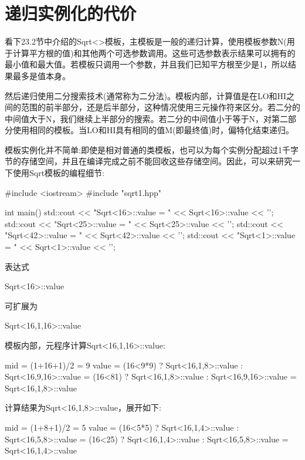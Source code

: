 \section{递归实例化的代价}

看下23.2节中介绍的Sqrt<>模板，主模板是一般的递归计算，使用模板参数N(用于计算平方根的值)和其他两个可选参数调用。这些可选参数表示结果可以拥有的最小值和最大值。若模板只调用一个参数，并且我们已知平方根至少是1，所以结果最多是值本身。

然后递归使用二分搜索技术(通常称为二分法)。模板内部，计算值是在LO和HI之间的范围的前半部分，还是后半部分，这种情况使用三元操作符来区分。若二分的中间值大于N，我们继续上半部分的搜索。若二分的中间值小于等于N，对第二部分使用相同的模板。当LO和HI具有相同的值M(即最终值)时，偏特化结束递归。

模板实例化并不简单:即使是相对普通的类模板，也可以为每个实例分配超过1千字节的存储空间，并且在编译完成之前不能回收这些存储空间。因此，可以来研究一下使用Sqrt模板的编程细节:

\begin{cpp}
#include <iostream>
#include "sqrt1.hpp"

int main()
{
	std::cout << "Sqrt<16>::value = " << Sqrt<16>::value << ’\n’;
	std::cout << "Sqrt<25>::value = " << Sqrt<25>::value << ’\n’;
	std::cout << "Sqrt<42>::value = " << Sqrt<42>::value << ’\n’;
	std::cout << "Sqrt<1>::value = " << Sqrt<1>::value << ’\n’;
}
\end{cpp}

表达式

\begin{cpp}
Sqrt<16>::value
\end{cpp}

可扩展为

\begin{cpp}
Sqrt<16,1,16>::value
\end{cpp}

模板内部，元程序计算Sqrt<16,1,16>::value:

\begin{cpp}
mid = (1+16+1)/2
	= 9
value = (16<9*9) ? Sqrt<16,1,8>::value
				: Sqrt<16,9,16>::value
	  = (16<81) ? Sqrt<16,1,8>::value
				: Sqrt<16,9,16>::value
	  = Sqrt<16,1,8>::value
\end{cpp}

计算结果为Sqrt<16,1,8>::value，展开如下:

\begin{cpp}
mid = (1+8+1)/2
	= 5
value = (16<5*5) ? Sqrt<16,1,4>::value
				: Sqrt<16,5,8>::value
	  = (16<25) ? Sqrt<16,1,4>::value
				: Sqrt<16,5,8>::value
	  = Sqrt<16,1,4>::value
\end{cpp}

